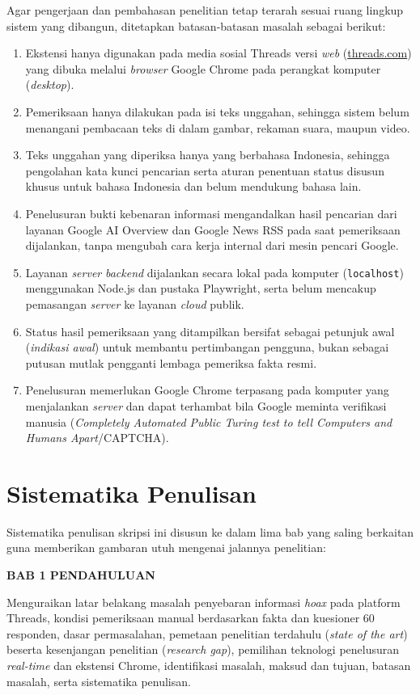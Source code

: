 \documentclass[12pt,a4paper,twoside]{report}
\begin{document}
Agar pengerjaan dan pembahasan penelitian tetap terarah sesuai ruang lingkup sistem yang dibangun, ditetapkan batasan-batasan masalah sebagai berikut:
\begin{enumerate}[leftmargin=0.8cm,itemsep=3pt,topsep=2pt]
  \item Ekstensi hanya digunakan pada media sosial Threads versi \textit{web} (\url{threads.com}) yang dibuka melalui \textit{browser} Google Chrome pada perangkat komputer (\textit{desktop}).
  \item Pemeriksaan hanya dilakukan pada isi teks unggahan, sehingga sistem belum menangani pembacaan teks di dalam gambar, rekaman suara, maupun video.
  \item Teks unggahan yang diperiksa hanya yang berbahasa Indonesia, sehingga pengolahan kata kunci pencarian serta aturan penentuan status disusun khusus untuk bahasa Indonesia dan belum mendukung bahasa lain.
  \item Penelusuran bukti kebenaran informasi mengandalkan hasil pencarian dari layanan Google AI Overview dan Google News RSS pada saat pemeriksaan dijalankan, tanpa mengubah cara kerja internal dari mesin pencari Google.
  \item Layanan \textit{server} \textit{backend} dijalankan secara lokal pada komputer (\texttt{localhost}) menggunakan Node.js dan pustaka Playwright, serta belum mencakup pemasangan \textit{server} ke layanan \textit{cloud} publik.
  \item Status hasil pemeriksaan yang ditampilkan bersifat sebagai petunjuk awal (\textit{indikasi awal}) untuk membantu pertimbangan pengguna, bukan sebagai putusan mutlak pengganti lembaga pemeriksa fakta resmi.
  \item Penelusuran memerlukan Google Chrome terpasang pada komputer yang menjalankan \textit{server} dan dapat terhambat bila Google meminta verifikasi manusia (\textit{Completely Automated Public Turing test to tell Computers and Humans Apart}/CAPTCHA).
\end{enumerate}

\section{Sistematika Penulisan}

Sistematika penulisan skripsi ini disusun ke dalam lima bab yang saling berkaitan guna memberikan gambaran utuh mengenai jalannya penelitian:

\noindent\textbf{BAB 1 PENDAHULUAN}\par\nopagebreak
Menguraikan latar belakang masalah penyebaran informasi \textit{hoax} pada platform Threads, kondisi pemeriksaan manual berdasarkan fakta dan kuesioner 60 responden, dasar permasalahan, pemetaan penelitian terdahulu (\textit{state of the art}) beserta kesenjangan penelitian (\textit{research gap}), pemilihan teknologi penelusuran \textit{real-time} dan ekstensi Chrome, identifikasi masalah, maksud dan tujuan, batasan masalah, serta sistematika penulisan.
\end{document}
